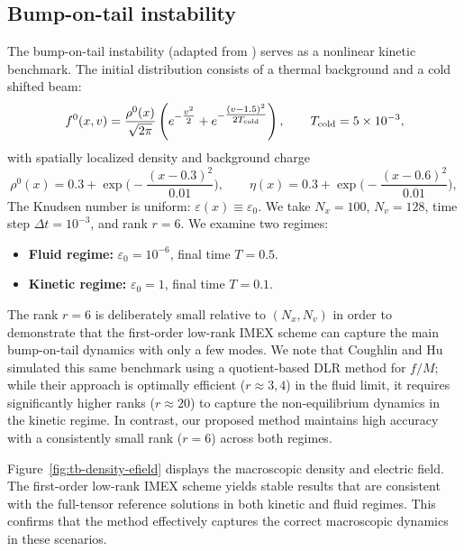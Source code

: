 \documentclass[]{article}
\numberwithin{equation}{section}
\begin{document}
\subsection{Bump-on-tail instability}
\label{sec:bump_on_tail}
The bump-on-tail instability (adapted from \cite{coughlin2022efficient}) serves as a nonlinear kinetic benchmark. The initial distribution consists of a thermal background and a cold shifted beam:
\[
  f^0(x,v)=\frac{\rho^0(x)}{\sqrt{2\pi}}
  \left(e^{-\tfrac{v^2}{2}}+e^{-\tfrac{(v-1.5)^2}{2T_{\rm cold}}}\right),
  \qquad T_{\rm cold}=5\times10^{-3},
\]
with spatially localized density and background charge
\[
  \rho^0(x)=0.3+\exp\!\Big(-\frac{(x-0.3)^2}{0.01}\Big),\qquad
  \eta(x)=0.3+\exp\!\Big(-\frac{(x-0.6)^2}{0.01}\Big),
\]
The Knudsen number is uniform: $\varepsilon(x)\equiv\varepsilon_0$. We take $N_x=100$, $N_v=128$, time step $\Delta t=10^{-3}$, and rank $r=6$. 
We examine two regimes:
\begin{itemize}\setlength{\itemsep}{2pt}
  \item \textbf{Fluid regime:} $\varepsilon_0=10^{-6}$, final time $T=0.5$.
  \item \textbf{Kinetic regime:} $\varepsilon_0=1$, final time $T=0.1$.
\end{itemize}
The rank $r=6$ is deliberately small relative to $(N_x,N_v)$ in order to demonstrate that the first-order low-rank IMEX scheme can capture the main bump-on-tail dynamics with only a few modes.
We note that Coughlin and Hu \cite{coughlin2022efficient} simulated this same benchmark using a quotient-based DLR method for $f/M$; while their approach is optimally efficient ($r \approx 3, 4$) in the fluid limit, it requires significantly higher ranks ($r \approx 20$) to capture the non-equilibrium dynamics in the kinetic regime. In contrast, our proposed method maintains high accuracy with a consistently small rank ($r=6$) across both regimes.

Figure~\ref{fig:tb-density-efield} displays the macroscopic density and electric field. 
The first-order low-rank IMEX scheme yields stable results that are consistent with the full-tensor reference solutions in both kinetic and fluid regimes. This confirms that the method effectively captures the correct macroscopic dynamics in these scenarios.
\end{document}
